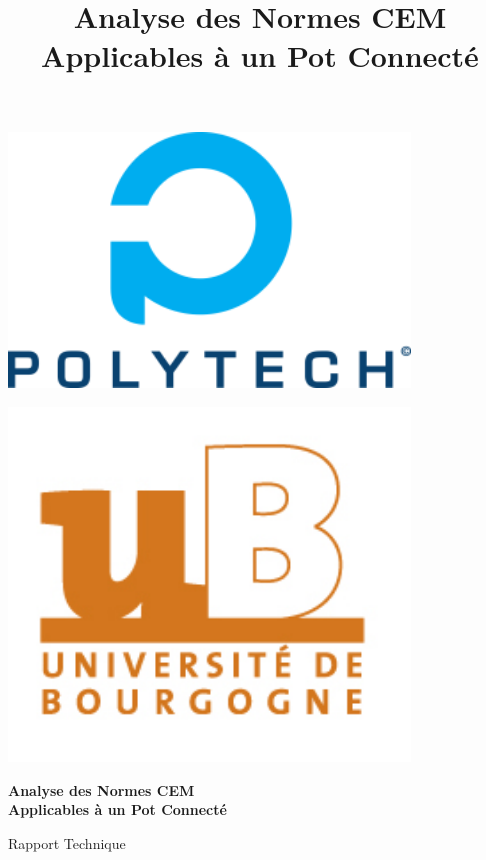 \documentclass[a4paper,12pt]{article}
\title{Analyse des Normes CEM Applicables à un Pot Connecté}
\author{}
\date{}
\begin{document}
\begin{titlepage}
    \begin{center}
        \vspace*{2cm}
        \begin{minipage}{0.4\textwidth}
            \centering
            \includegraphics[width=0.8\textwidth]{imgs/polytech.png}
        \end{minipage}
        \hspace{1cm}
        \begin{minipage}{0.4\textwidth}
            \centering
            \includegraphics[width=0.8\textwidth]{imgs/ub.jpg}
        \end{minipage}

        \vspace{2cm}
        \Huge
        \textbf{Analyse des Normes CEM\\Applicables à un Pot Connecté}

        \vspace{1cm}
        \Large
        Rapport Technique


\end{center}
\end{titlepage}
\end{document}
